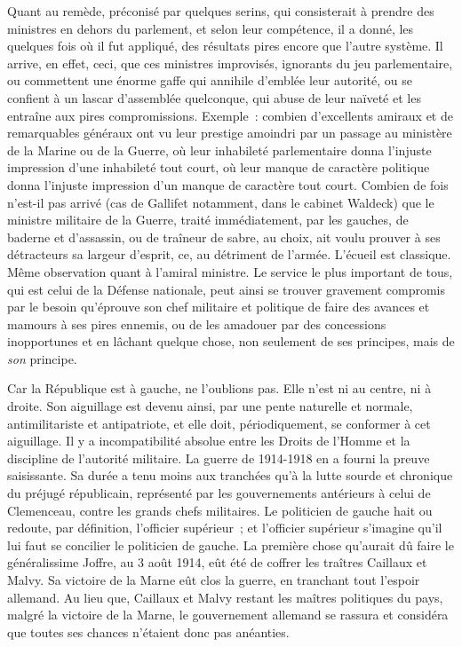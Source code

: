 \documentclass[french,twoside]{book} %
\begin{document}
Quant au remède, préconisé par quelques serins, qui consisterait à prendre des ministres en dehors du parlement, et selon leur compétence, il a donné, les quelques fois où il fut appliqué, des résultats pires encore que l’autre système. Il arrive, en effet, ceci, que ces ministres improvisés, ignorants du jeu parlementaire, ou commettent une énorme gaffe qui annihile d’emblée leur autorité, ou se confient à un lascar d’assemblée quelconque, qui abuse de leur naïveté et les entraîne aux pires compromissions. Exemple : combien d’excellents amiraux et de remarquables généraux ont vu leur prestige amoindri par un passage au ministère de la Marine ou de la Guerre, où leur inhabileté parlementaire donna l’injuste impression d’une inhabileté tout court, où leur manque de caractère politique donna l’injuste impression d’un manque de caractère tout court. Combien de fois n’est-il pas arrivé (cas de Gallifet notamment, dans le cabinet Waldeck) que le ministre militaire de la Guerre, traité immédiatement, par les gauches, de baderne et d’assassin, ou de traîneur de sabre, au choix, ait voulu prouver à ses détracteurs sa largeur d’esprit, ce, au détriment de l’armée. L’écueil est classique. Même observation quant à l’amiral ministre. Le service le plus important de tous, qui est celui de la Défense nationale, peut ainsi se trouver gravement compromis par le besoin qu’éprouve son chef militaire et politique de faire des avances et mamours à ses pires ennemis, ou de les amadouer par des concessions inopportunes et en lâchant quelque chose, non seulement de ses principes, mais de {\itshape son} principe.\par
Car la République est à gauche, ne l’oublions pas. Elle n’est ni au centre, ni à droite. Son aiguillage est devenu ainsi, par une pente naturelle et normale, antimilitariste et antipatriote, et elle doit, périodiquement, se conformer à cet aiguillage. Il y a incompatibilité absolue entre les Droits de l’Homme et la discipline de l’autorité militaire. La guerre de 1914-1918 en a fourni la preuve saisissante. Sa durée a tenu moins aux tranchées qu’à la lutte sourde et chronique du préjugé républicain, représenté par les gouvernements antérieurs à celui de Clemenceau, contre les grands chefs militaires. Le politicien de gauche hait ou redoute, par définition, l’officier supérieur ; et l’officier supérieur s’imagine qu’il lui faut se concilier le politicien de gauche. La première chose qu’aurait dû faire le généralissime Joffre, au 3 août 1914, eût été de coffrer les traîtres Caillaux et Malvy. Sa victoire de la Marne eût clos la guerre, en tranchant tout l’espoir allemand. Au lieu que, Caillaux et Malvy restant les maîtres politiques du pays, malgré la victoire de la Marne, le gouvernement allemand se rassura et considéra que toutes ses chances n’étaient donc pas anéanties.\par
\end{document}
